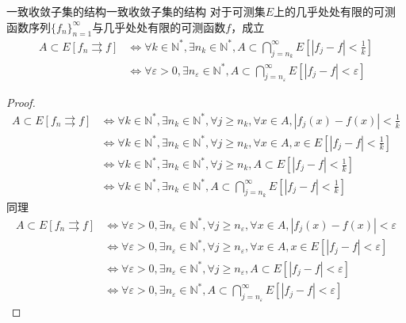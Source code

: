 \documentclass[lang = cn, scheme = chinese, thmcnt = section]{elegantbook}
\newcommand{\N}{\mathbb{N}}            %
\newcommand{\sub}{\subset}             %
\begin{document}
\begin{theorem}{一致收敛子集的结构}{一致收敛子集的结构}
	对于可测集$E$上的几乎处处有限的可测函数序列$\{f_n\}_{n=1}^{\infty}$与几乎处处有限的可测函数$f$，成立%
	\begin{align*}
		A\sub E[f_n\rightrightarrows f]
		& \iff \forall k\in\N^*,\exists n_k\in\N^*,A\sub \bigcap_{j=n_k}^{\infty}E\left[ |f_j-f|<\frac{1}{k} \right] \\
		& \iff \forall \varepsilon>0,\exists n_{\varepsilon}\in\N^*,A\sub\bigcap_{j=n_{\varepsilon}}^{\infty} E[|f_j-f|<\varepsilon]
	\end{align*}
\end{theorem}

\begin{proof}
	\begin{align*}
		A\sub E[f_n\rightrightarrows f]
		& \iff \forall k\in\N^*,\exists n_k\in\N^*,\forall j\ge n_k,\forall x\in A,|f_j(x)-f(x)|<\frac{1}{k} \\
		& \iff \forall k\in\N^*,\exists n_k\in\N^*,\forall j\ge n_k,\forall x\in A,x\in E\left[ |f_j-f|<\frac{1}{k} \right] \\
		& \iff \forall k\in\N^*,\exists n_k\in\N^*,\forall j\ge n_k,A\sub E\left[ |f_j-f|<\frac{1}{k} \right] \\
		& \iff \forall k\in\N^*,\exists n_k\in\N^*,A\sub \bigcap_{j=n_k}^{\infty}E\left[ |f_j-f|<\frac{1}{k} \right]
	\end{align*}
	同理
	\begin{align*}
		A\sub E[f_n\rightrightarrows f]
		& \iff \forall \varepsilon>0,\exists n_{\varepsilon}\in\N^*,\forall j\ge n_{\varepsilon},\forall x\in A,|f_j(x)-f(x)|<\varepsilon \\
		& \iff \forall \varepsilon>0,\exists n_{\varepsilon}\in\N^*,\forall j\ge n_{\varepsilon},\forall x\in A,x\in E[|f_j-f|<\varepsilon] \\
		& \iff \forall \varepsilon>0,\exists n_{\varepsilon}\in\N^*,\forall j\ge n_{\varepsilon},A\sub E[|f_j-f|<\varepsilon] \\
		& \iff \forall \varepsilon>0,\exists n_{\varepsilon}\in\N^*,A\sub\bigcap_{j=n_{\varepsilon}}^{\infty} E[|f_j-f|<\varepsilon]
	\end{align*}
\end{proof}
\end{document}
